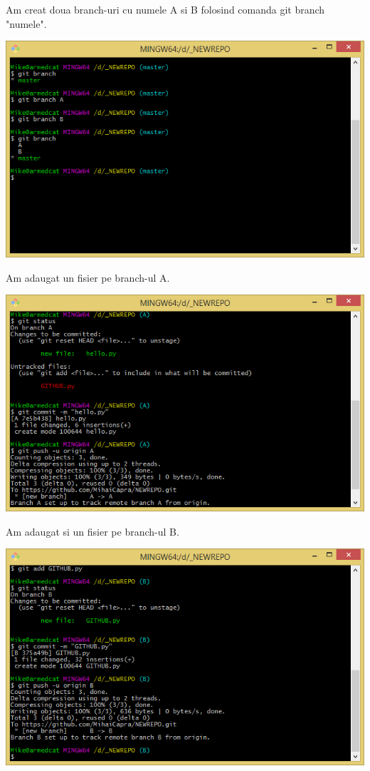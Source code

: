 Am creat doua branch-uri cu numele A si B folosind comanda git branch "numele".
\begin{center}
\includegraphics[scale=0.7]{images/git_branch}\\
\end{center}
Am adaugat un fisier pe branch-ul A.
\begin{center}
\includegraphics[scale=0.7]{images/A}
\end{center}
Am adaugat si un fisier pe branch-ul B.
\begin{center}
\includegraphics[scale=0.7]{images/B}
\end{center}
